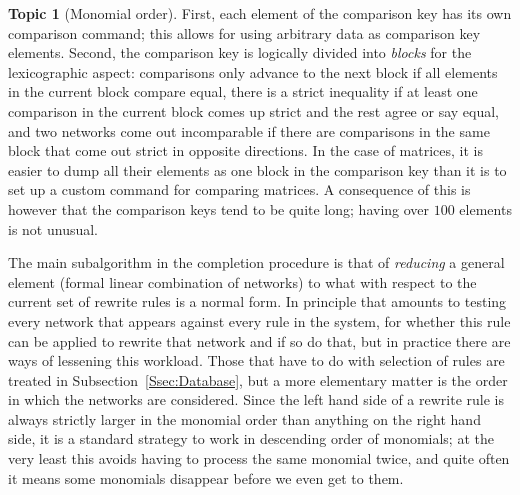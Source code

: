 \documentclass{article}
\theoremstyle{definition}
\newtheorem{topic}{Topic}
\begin{document}
\begin{topic}[Monomial order]
  First, each element of the comparison key has its own comparison 
  command; this allows for using arbitrary data as comparison key 
  elements. Second, the comparison key is logically divided into 
  \emph{blocks} for the lexicographic aspect: comparisons only 
  advance to the next block if all elements in the current block 
  compare equal, there is a strict inequality if at least one 
  comparison in the current block comes up strict and the rest agree 
  or say equal, and two networks come out incomparable if there are 
  comparisons in the same block that come out strict in opposite 
  directions. In the case of matrices, it is easier to dump all their 
  elements as one block in the comparison key than it is to set up a 
  custom command for comparing matrices. A consequence of this is 
  however that the comparison keys tend to be quite long; having over 
  $100$ elements is not unusual.
\end{topic}

The main subalgorithm in the completion procedure is that of 
\emph{reducing} a general element (formal linear combination of 
networks) to what with respect to the current set of rewrite rules is 
a normal form. In principle that amounts to testing every network that 
appears against every rule in the system, for whether this rule can 
be applied to rewrite that network and if so do that, but in practice 
there are ways of lessening this workload. Those that have to do with 
selection of rules are treated in Subsection~\ref{Ssec:Database}, 
but a more elementary matter is the order in which the networks are 
considered. Since the left hand side of a rewrite rule is always 
strictly larger in the monomial order than anything on the right hand 
side, it is a standard strategy to work in descending order of 
monomials; at the very least this avoids having to process the same 
monomial twice, and quite often it means some monomials disappear 
before we even get to them.
\end{document}
